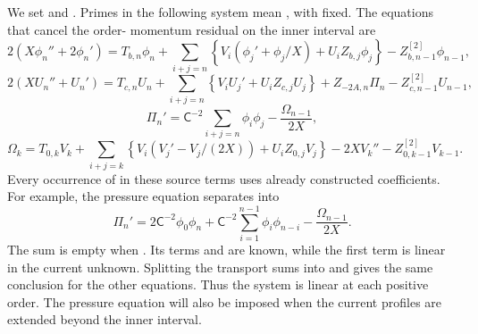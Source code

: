 We set  and
. Primes in the following system mean
, with  fixed. The
equations that cancel the order- momentum residual on
the inner interval are
\begin{equation}
\label{eq:5.3}
2(X\phi_n''+2\phi_n')
=T_{b,n}\phi_n
+\sum_{i+j=n}\left\{V_i(\phi_j'+\phi_j/X)+U_iZ_{b,j}\phi_j\right\}
-Z_{b,n-1}^{[2]}\phi_{n-1},
\tag{5.3}
\end{equation}
\begin{equation}
\label{eq:5.4}
2(XU_n''+U_n')
=T_{c,n}U_n
+\sum_{i+j=n}\left\{V_iU_j'+U_iZ_{c,j}U_j\right\}
+Z_{-2A,n}\Pi_n-Z_{c,n-1}^{[2]}U_{n-1},
\tag{5.4}
\end{equation}
\begin{equation}
\label{eq:5.5}
\Pi_n'=\mathsf C^{-2}\sum_{i+j=n}\phi_i\phi_j-\frac{\Omega_{n-1}}{2X},
\tag{5.5}
\end{equation}
\begin{equation}
\label{eq:5.6}
\Omega_k=T_{0,k}V_k
+\sum_{i+j=k}\left\{V_i(V_j'-V_j/(2X))+U_iZ_{0,j}V_j\right\}
-2XV_k''-Z_{0,k-1}^{[2]}V_{k-1}.
\tag{5.6}
\end{equation}
%
Every occurrence of 
in these source terms uses already constructed coefficients. For example, the
pressure equation separates into
\[
\Pi_n'=2\mathsf C^{-2}\phi_0\phi_n
+\mathsf C^{-2}\sum_{i=1}^{n-1}\phi_i\phi_{n-i}
-\frac{\Omega_{n-1}}{2X}.
\]
The sum is empty when . Its terms and
 are known, while the first term is linear in
the current unknown. Splitting the transport sums into
 and
 gives the same conclusion for the other
equations. Thus the system is linear at each positive order. The pressure
equation will also be imposed when the current profiles are extended beyond
the inner interval.

